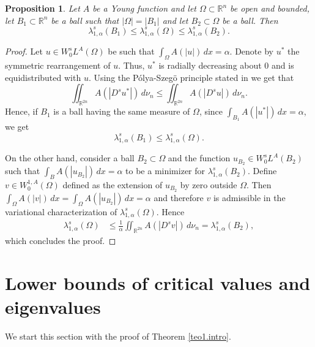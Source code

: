 \documentclass[12pt,reqno]{amsart}
\newtheorem{prop}[thm]{Proposition}
\theoremstyle{definition}
\theoremstyle{remark}
\numberwithin{equation}{section}
\begin{document}
 

\begin{prop} \label{autov.compara}
Let $A$ be a Young function and let $\Omega\subset \mathbb{R}^n$ be open and bounded,  let $B_1\subset \mathbb{R}^n$ be a ball  such that $|\Omega|=|B_1|$ and let $B_2\subset \Omega$ be a ball. Then
$$
\lambda_{1,\alpha}^s(B_1) \leq \lambda_{1,\alpha}^s(\Omega) \leq \lambda_{1,\alpha}^s(B_2).
$$
\end{prop}
\begin{proof}
Let $u\in W^s_0 L^A(\Omega)$ be such that $\int_\Omega A(|u|)\,dx =\alpha$. Denote by $u^*$ the symmetric rearrangement of $u$. Thus, $u^*$ is radially decreasing about 0 and is equidistributed with $u$. Using the P\'olya-Szeg\"o principle stated in \cite[Theorem 3.1]{ACPS} we get that
$$
\iint_{\mathbb{R}^{2n}} A(|D^s u^*|)\,d\nu_n \leq \iint_{\mathbb{R}^{2n}} A(|D^s u|)\,d\nu_n.
$$
Hence, if $B_1$ is a ball having the same measure of $\Omega$, since $\int_{B_1} A(|u^*|)\,dx = \alpha$, we get
$$
\lambda_{1,\alpha}^s(B_1) \leq \lambda_{1,\alpha}^s(\Omega).
$$

On the other hand, consider a ball $B_2\subset \Omega $ and the function $u_{B_2} \in W^{s}_0L^A(B_2)$  such that $\int_B A(|u_{B_2}|)\,dx =\alpha$  to be a minimizer for $\lambda_{1,\alpha}^s(B_2)$. Define $v\in W^{1,A}_0(\Omega)$ defined as the extension of $u_{B_2}$ by zero outside $\Omega$. Then $\int_\Omega A(|v|)\,dx=\int_\Omega A(|u_{B_2}|)\,dx =\alpha$ and therefore $v$ is admissible in the variational characterization of $\lambda_{1,\alpha}^s(\Omega)$. Hence
\begin{align*}
\lambda_{1,\alpha}^s(\Omega) &\leq \frac{1}{\alpha}\iint_{\mathbb{R}^{2n}} A(|D^s v|)\,d\nu_n = \lambda_{1,\alpha}^s(B_2),
\end{align*}
which concludes the proof.
\end{proof}


 




 
\section{Lower bounds of critical values and eigenvalues}

We start this section with the proof of Theorem \ref{teo1.intro}. 
\end{document}
